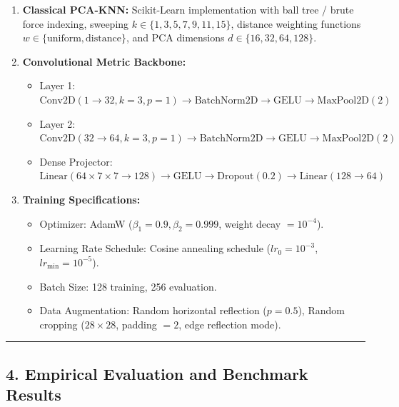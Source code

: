 \begin{enumerate}
\def\labelenumi{\arabic{enumi}.}
\tightlist
\item
  \textbf{Classical PCA-KNN:} Scikit-Learn implementation with ball tree
  / brute force indexing, sweeping \(k \in \{1, 3, 5, 7, 9, 11, 15\}\),
  distance weighting functions
  \(w \in \{\text{uniform}, \text{distance}\}\), and PCA dimensions
  \(d \in \{16, 32, 64, 128\}\).
\item
  \textbf{Convolutional Metric Backbone:}

  \begin{itemize}
  \tightlist
  \item
    Layer 1:
    \(\text{Conv2D}(1 \to 32, k=3, p=1) \to \text{BatchNorm2D} \to \text{GELU} \to \text{MaxPool2D}(2)\)
  \item
    Layer 2:
    \(\text{Conv2D}(32 \to 64, k=3, p=1) \to \text{BatchNorm2D} \to \text{GELU} \to \text{MaxPool2D}(2)\)
  \item
    Dense Projector:
    \(\text{Linear}(64 \times 7 \times 7 \to 128) \to \text{GELU} \to \text{Dropout}(0.2) \to \text{Linear}(128 \to 64)\)
  \end{itemize}
\item
  \textbf{Training Specifications:}

  \begin{itemize}
  \tightlist
  \item
    Optimizer: AdamW (\(\beta_1=0.9, \beta_2=0.999\), weight decay
    \(= 10^{-4}\)).
  \item
    Learning Rate Schedule: Cosine annealing schedule
    (\(lr_0 = 10^{-3}\), \(lr_{\min} = 10^{-5}\)).
  \item
    Batch Size: 128 training, 256 evaluation.
  \item
    Data Augmentation: Random horizontal reflection (\(p=0.5\)), Random
    cropping (\(28 \times 28\), padding \(=2\), edge reflection mode).
  \end{itemize}
\end{enumerate}

\begin{center}\rule{0.5\linewidth}{0.5pt}\end{center}

\subsection{4. Empirical Evaluation and Benchmark
Results}\label{4-empirical-evaluation-and-benchmark-results}

